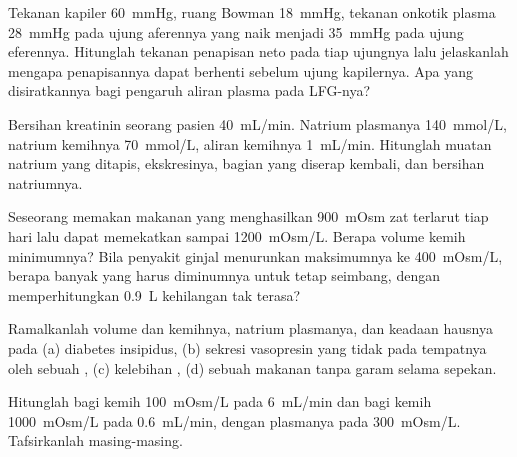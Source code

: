 \begin{exercise}[$\star\star$]\label{exo:b3:renal-osmoregulation:5}
Tekanan kapiler  \qty{60}{mmHg}, ruang Bowman
\qty{18}{mmHg}, tekanan onkotik plasma \qty{28}{mmHg} pada ujung
aferennya yang naik menjadi \qty{35}{mmHg} pada ujung eferennya. Hitunglah tekanan
penapisan neto pada tiap ujungnya lalu jelaskanlah mengapa penapisannya dapat berhenti
sebelum ujung kapilernya. Apa yang disiratkannya bagi pengaruh
aliran plasma pada LFG-nya?
\end{exercise}

\begin{exercise}[$\star\star$]\label{exo:b3:renal-osmoregulation:6}
Bersihan kreatinin seorang pasien \qty{40}{mL/min}. Natrium plasmanya
\qty{140}{mmol/L}, natrium kemihnya \qty{70}{mmol/L}, aliran kemihnya
\qty{1}{mL/min}. Hitunglah muatan natrium yang ditapis, ekskresinya,
bagian yang diserap kembali, dan bersihan natriumnya.
\end{exercise}

\begin{exercise}[$\star\star$]\label{exo:b3:renal-osmoregulation:7}
Seseorang memakan makanan yang menghasilkan \qty{900}{mOsm} zat terlarut tiap hari lalu dapat
memekatkan sampai \qty{1200}{mOsm/L}. Berapa volume kemih minimumnya? Bila penyakit
ginjal menurunkan maksimumnya ke \qty{400}{mOsm/L}, berapa banyak yang harus
diminumnya untuk tetap seimbang, dengan memperhitungkan \qty{0.9}{L} kehilangan tak terasa?
\end{exercise}

\begin{exercise}[$\star\star$]\label{exo:b3:renal-osmoregulation:8}
Ramalkanlah volume dan  kemihnya, natrium plasmanya, dan
keadaan hausnya pada (a) diabetes insipidus, (b) sekresi vasopresin yang
tidak pada tempatnya oleh sebuah , (c) kelebihan , (d) sebuah makanan tanpa
garam selama sepekan.
\end{exercise}

\begin{exercise}[$\star\star$]\label{exo:b3:renal-osmoregulation:9}
Hitunglah  bagi kemih \qty{100}{mOsm/L} pada
\qty{6}{mL/min} dan bagi kemih \qty{1000}{mOsm/L} pada
\qty{0.6}{mL/min}, dengan plasmanya pada \qty{300}{mOsm/L}. Tafsirkanlah masing-masing.
\end{exercise}

